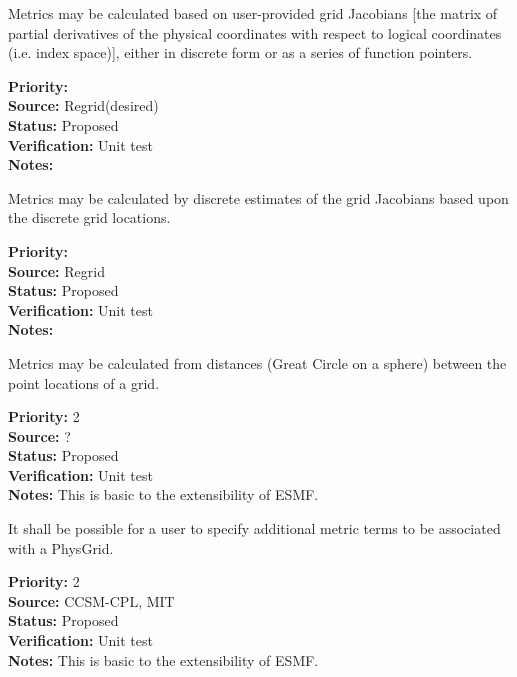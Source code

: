Metrics may be calculated based on user-provided grid Jacobians [the matrix of
partial derivatives of the physical coordinates with respect to logical
coordinates (i.e. index space)], either in discrete form or as a series of function pointers.
\begin{reqlist}
{\bf Priority:}  \\
{\bf Source:} Regrid(desired) \\
{\bf Status:} Proposed \\
{\bf Verification:} Unit test \\
{\bf Notes:} 
\end{reqlist}

Metrics may be calculated by discrete estimates of the grid Jacobians based upon
the discrete grid locations.
\begin{reqlist}
{\bf Priority:}  \\
{\bf Source:} Regrid \\
{\bf Status:} Proposed \\
{\bf Verification:} Unit test \\
{\bf Notes:}
\end{reqlist}

Metrics may be calculated from distances (Great Circle on a sphere) between
the point locations of a grid.
\begin{reqlist}
{\bf Priority:} 2 \\
{\bf Source:} ? \\
{\bf Status:} Proposed \\
{\bf Verification:} Unit test \\
{\bf Notes:} This is basic to the extensibility of ESMF. 
\end{reqlist}

It shall be possible for a user to specify additional metric terms to be associated
with a PhysGrid.
\begin{reqlist}
{\bf Priority:} 2 \\
{\bf Source:} CCSM-CPL, MIT \\
{\bf Status:} Proposed \\
{\bf Verification:} Unit test \\
{\bf Notes:} This is basic to the extensibility of ESMF. 
\end{reqlist}




